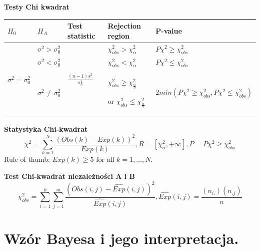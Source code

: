 \documentclass[12pt]{article}
\begin{document}
    \textbf{Testy Chi kwadrat}
    \begin{table}[H]
        \begin{center}
            \begin{tabular}{ p{} |p{} |p{} |p{} | p{}}
                \toprule
                $H_0$ &  $H_A$ & Test statistic & Rejection region & P-value \\
                \toprule
                \multirow{3}{*}{$\sigma^2 = \sigma_0^2$} & $\sigma^2 > \sigma_0^2$
                & \multirow{3}{*}{$\frac{(n-1)s^2}{\sigma_0^2}$} & $\chi_{obs}^2 > \chi_{\alpha}^2$ & $P{\chi^2 \geq \chi_{obs}^2}$\\

                & $\sigma^2 < \sigma_0^2$ & & $\chi_{obs}^2 < \chi_{\alpha}^2$ & $P{\chi^2 \leq \chi_{obs}^2}$\\


                & $\sigma^2 \neq \sigma_0^2$ & & $\chi_{obs}^2 \geq \chi_{\frac{\alpha}{2}}^2$

                or $\chi_{obs}^2 \leq \chi_{\frac{\alpha}{2}}^2$
                & $2 min(P{\chi^2 \geq \chi_{obs}^2}, P{\chi^2 \leq \chi_{obs}^2})$\\

                \bottomrule
            \end{tabular}
        \end{center}
    \end{table}

    \textbf{Statystyka Chi-kwadrat}
    \begin{equation*}
        \chi^2 = \sum_{k=1}^{N} \frac{(Obs(k) - Exp(k))^2}{Exp(k)}, R = [\chi_{\alpha}^2, +\infty], P = P{\chi^2 \geq \chi_{obs}^2}
    \end{equation*}
    Rule of thumb: $Exp(k) \geq 5 \text{ for all }k = 1, \dots, N$.

    \textbf{Test Chi-kwadrat niezależności A i B}
    \begin{equation*}
        \chi_{obs}^2 = \sum_{i=1}^k \sum_{j=1}^m \frac{(Obs(i,j) - \hat{Exp}(i,j))^2}{\hat{Exp}(i,j)}, \hat{Exp}(i,j) = \frac{(n_{i.})(n_{.j})}{n}
    \end{equation*}

    \newpage

    \section{Wzór Bayesa i jego interpretacja.}
\end{document}
